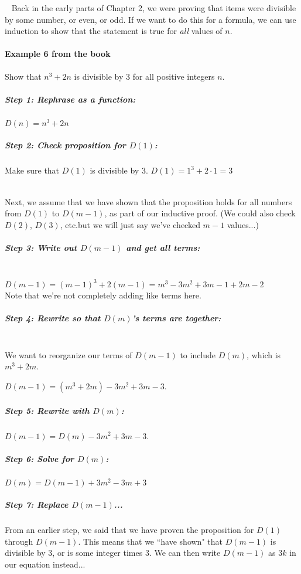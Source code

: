 \documentclass[a4paper,12pt]{book}
\begin{document}
        \begin{intro}{\ }
            \small 
            Back in the early parts of Chapter 2, we were proving that
            items were divisible by some number, or even, or odd.
            If we want to do this for a formula, we can use induction
            to show that the statement is true for \textit{all}
            values of $n$.

            \paragraph{Example 6 from the book}
                Show that $n^{3} + 2n$ is divisible by 3 for all positive
                integers $n$.

            \subparagraph{Step 1: Rephrase as a function:}
                $D(n) = n^{3} + 2n$

            \subparagraph{Step 2: Check proposition for $D(1)$:}
                Make sure that $D(1)$ is divisible by 3. \tab
                $D(1) = 1^{3} + 2 \cdot 1 = 3$ \checkmark{}

            ~\\
            Next, we assume that we have shown that the proposition holds
            for all numbers from $D(1)$ to $D(m-1)$, as part of our inductive
            proof. (We could also check $D(2)$, $D(3)$, etc.but we will just say
            we've checked $m-1$ values...)

            \subparagraph{Step 3: Write out $D(m-1)$ and get all terms:} ~\\            
                $D(m-1) = (m-1)^{3} + 2(m-1) = m^{3} - 3m^{2} + 3m - 1 + 2m - 2$ \\
                Note that we're not completely adding like terms here.

            \subparagraph{Step 4: Rewrite so that $D(m)$'s terms are together:} ~\\
                We want to reorganize our terms of $D(m-1)$ to include $D(m)$, which is
                $m^{3} + 2m$.

                $D(m-1) = (m^{3} + 2m) - 3m^{2} + 3m - 3$.

            \subparagraph{Step 5: Rewrite with $D(m)$:}
                $D(m-1) = D(m) - 3m^{2} + 3m - 3$.

            \subparagraph{Step 6: Solve for $D(m)$:}
                $D(m) = D(m-1) + 3m^{2} - 3m + 3$

            \subparagraph{Step 7: Replace $D(m-1)$...}
                From an earlier step, we said that we have proven
                the proposition for $D(1)$ through $D(m-1)$. This means
                that we ``have shown" that $D(m-1)$ is divisible by 3, or
                is some integer times 3. We can then write $D(m-1)$ as
                $3k$ in our equation instead...


\end{intro}
\end{document}

